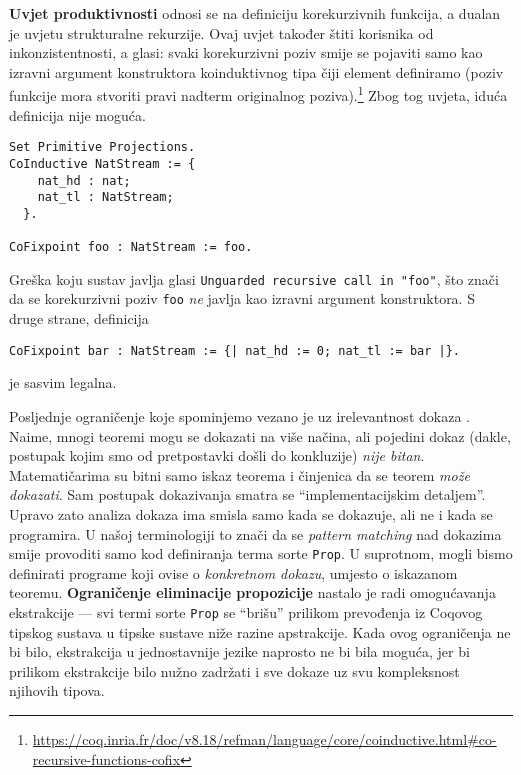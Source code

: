 \textbf{Uvjet produktivnosti} odnosi se na definiciju korekurzivnih funkcija, a dualan je uvjetu strukturalne rekurzije.
Ovaj uvjet također štiti korisnika od inkonzistentnosti, a glasi: svaki korekurzivni poziv smije se pojaviti samo kao izravni argument konstruktora koinduktivnog tipa čiji element definiramo (poziv funkcije mora stvoriti pravi nadterm originalnog poziva).\footnote{\url{https://coq.inria.fr/doc/v8.18/refman/language/core/coinductive.html\#co-recursive-functions-cofix}}
Zbog tog uvjeta, iduća definicija nije moguća.
\begin{verbatim}
Set Primitive Projections.
CoInductive NatStream := {
    nat_hd : nat;
    nat_tl : NatStream;
  }.

CoFixpoint foo : NatStream := foo.
\end{verbatim}
Greška koju sustav javlja glasi \texttt{Unguarded recursive call in "foo"},
što znači da se korekurzivni poziv \texttt{foo} \textit{ne} javlja kao izravni argument konstruktora.
S druge strane, definicija
\begin{verbatim}
CoFixpoint bar : NatStream := {| nat_hd := 0; nat_tl := bar |}.
\end{verbatim}
\noindent je sasvim legalna.

Posljednje ograničenje koje spominjemo vezano je uz irelevantnost dokaza .
Naime, mnogi teoremi mogu se dokazati na više načina, ali pojedini dokaz (dakle, postupak kojim smo od pretpostavki došli do konkluzije) \textit{nije bitan}.
Matematičarima su bitni samo iskaz teorema i činjenica da se teorem \textit{može dokazati}.
Sam postupak dokazivanja smatra se \enquote{implementacijskim detaljem}.
Upravo zato analiza dokaza ima smisla samo kada se dokazuje, ali ne i kada se programira.
U našoj terminologiji to znači da se \textit{pattern matching} nad dokazima smije provoditi samo kod definiranja terma sorte \texttt{Prop}.
U suprotnom, mogli bismo definirati programe koji ovise o \textit{konkretnom dokazu}, umjesto o iskazanom teoremu.
\textbf{Ograničenje eliminacije propozicije} nastalo je radi omogućavanja ekstrakcije ---
svi termi sorte \texttt{Prop} se \enquote{brišu} prilikom prevođenja iz Coqovog tipskog sustava u tipske sustave niže razine apstrakcije.
Kada ovog ograničenja ne bi bilo, ekstrakcija u jednostavnije jezike naprosto ne bi bila moguća,
jer bi prilikom ekstrakcije bilo nužno zadržati i sve dokaze uz svu kompleksnost njihovih tipova.


